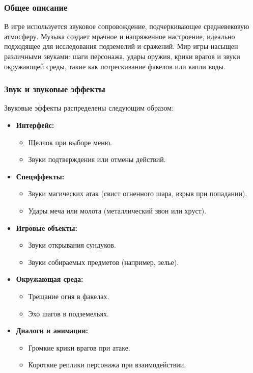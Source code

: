\documentclass{article}
\begin{document}
\subsubsection{Общее описание}
В игре используется звуковое сопровождение, подчеркивающее средневековую атмосферу. Музыка создает мрачное и напряженное настроение, идеально подходящее для исследования подземелий и сражений. Мир игры насыщен различными звуками: шаги персонажа, удары оружия, крики врагов и звуки окружающей среды, такие как потрескивание факелов или капли воды.
\subsubsection{Звук и звуковые эффекты}
Звуковые эффекты распределены следующим образом:
\begin{itemize}
    \item \textbf{Интерфейс:}
    \begin{itemize}
        \item Щелчок при выборе меню.
        \item Звуки подтверждения или отмены действий.
    \end{itemize}
    \item \textbf{Спецэффекты:}
    \begin{itemize}
        \item Звуки магических атак (свист огненного шара, взрыв при попадании).
        \item Удары меча или молота (металлический звон или хруст).
    \end{itemize}
    \item \textbf{Игровые объекты:}
    \begin{itemize}
        \item Звуки открывания сундуков.
        \item Звуки собираемых предметов (например, зелье).
    \end{itemize}
    \item \textbf{Окружающая среда:}
    \begin{itemize}
        \item Трещание огня в факелах.
        \item Эхо шагов в подземельях.
    \end{itemize}
    \item \textbf{Диалоги и анимации:}
    \begin{itemize}
        \item Громкие крики врагов при атаке.
        \item Короткие реплики персонажа при взаимодействии.
    \end{itemize}
\end{itemize}
\end{document}
